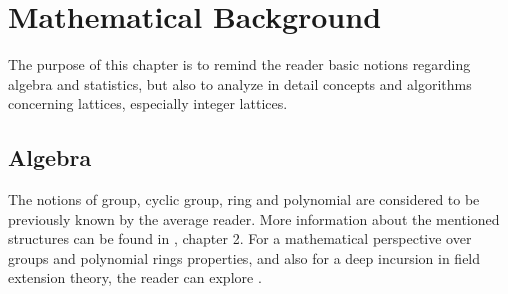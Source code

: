 \chapter{Mathematical Background}

The purpose of this chapter is to remind the reader basic notions regarding algebra and statistics, but also to analyze in detail concepts and algorithms concerning lattices, especially integer lattices. 

\section {Algebra}
The notions of group, cyclic group, ring and polynomial are considered to be previously known by the average reader. More information about the mentioned structures can be found in \cite{HPS08}, chapter 2. For a mathematical perspective over groups and polynomial rings properties, and also for a deep incursion in field extension theory, the reader can explore \cite{BB15}.

